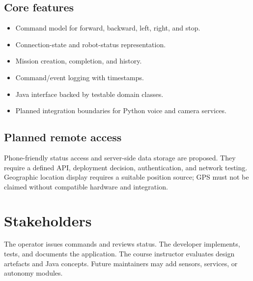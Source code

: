 \documentclass[12pt,a4paper]{article}
\begin{document}
\subsection{Core features}
\begin{itemize}
\item Command model for forward, backward, left, right, and stop.
\item Connection-state and robot-status representation.
\item Mission creation, completion, and history.
\item Command/event logging with timestamps.
\item Java interface backed by testable domain classes.
\item Planned integration boundaries for Python voice and camera services.
\end{itemize}
\subsection{Planned remote access}
Phone-friendly status access and server-side data storage are proposed. They require a defined API, deployment decision, authentication, and network testing. Geographic location display requires a suitable position source; GPS must not be claimed without compatible hardware and integration.

\section{Stakeholders}
The operator issues commands and reviews status. The developer implements, tests, and documents the application. The course instructor evaluates design artefacts and Java concepts. Future maintainers may add sensors, services, or autonomy modules.
\end{document}
